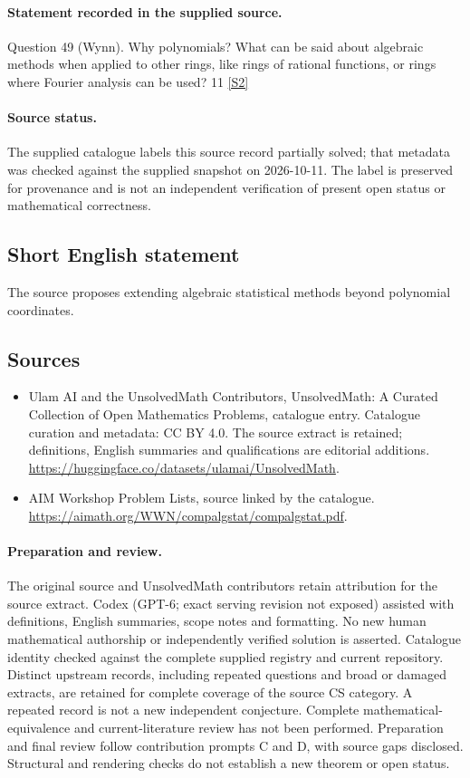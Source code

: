 \documentclass[11pt]{article}
\begin{document}
\paragraph{Statement recorded in the supplied source.}
Question 49 (Wynn). Why polynomials? What can be said about algebraic methods when applied to other rings, like rings of rational functions, or rings where Fourier analysis can be used? 11 \href{https://aimath.org/WWN/compalgstat/compalgstat.pdf}{[S2]}
\paragraph{Source status.}
The supplied catalogue labels this source record partially solved; that metadata was checked against the supplied snapshot on 2026-10-11. The label is preserved for provenance and is not an independent verification of present open status or mathematical correctness.
\subsection{Short English statement}
The source proposes extending algebraic statistical methods beyond polynomial coordinates.
\subsection{Sources}
\begin{itemize}
\item[S1] Ulam AI and the UnsolvedMath Contributors, UnsolvedMath: A Curated Collection of Open Mathematics Problems, catalogue entry. Catalogue curation and metadata: CC BY 4.0. The source extract is retained; definitions, English summaries and qualifications are editorial additions.
\url{https://huggingface.co/datasets/ulamai/UnsolvedMath}.
\item[S2] AIM Workshop Problem Lists, source linked by the catalogue.
\url{https://aimath.org/WWN/compalgstat/compalgstat.pdf}.
\end{itemize}
\paragraph{Preparation and review.}
The original source and UnsolvedMath contributors retain attribution for the source extract. Codex (GPT-6; exact serving revision not exposed) assisted with definitions, English summaries, scope notes and formatting. No new human mathematical authorship or independently verified solution is asserted. Catalogue identity checked against the complete supplied registry and current repository. Distinct upstream records, including repeated questions and broad or damaged extracts, are retained for complete coverage of the source CS category. A repeated record is not a new independent conjecture. Complete mathematical-equivalence and current-literature review has not been performed. Preparation and final review follow contribution prompts C and D, with source gaps disclosed. Structural and rendering checks do not establish a new theorem or open status.
\label{end:statement}
\end{document}
